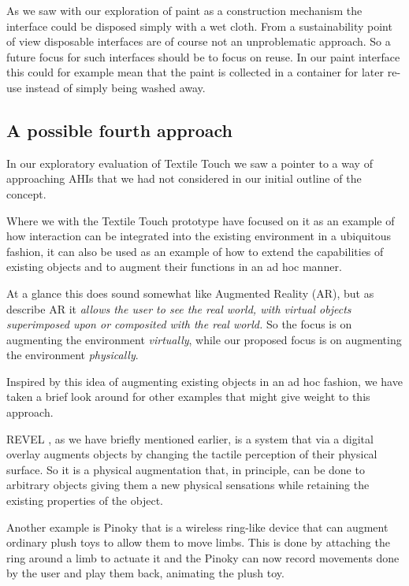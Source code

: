 As we saw with our exploration of paint as a construction mechanism the interface could be disposed simply with a wet cloth.
From a sustainability point of view disposable interfaces are of course not an unproblematic approach.
So a future focus for such interfaces should be to focus on reuse.
In our paint interface this could for example mean that the paint is collected in a container for later re-use instead of simply being washed away. 

\subsection{A possible fourth approach}
In our exploratory evaluation of Textile Touch we saw a pointer to a way of approaching AHIs that we had not considered in our initial outline of the concept.

Where we with the Textile Touch prototype have focused on it as an example of how interaction can be integrated into the existing environment in a ubiquitous fashion, it can also be used as an example of how to extend the capabilities of existing objects and to augment their functions in an ad hoc manner.

At a glance this does sound somewhat like Augmented Reality (AR), but as \citet{azuma1997survey} describe AR it \emph{allows the user to see the real world, with virtual objects superimposed upon or composited with the real world.}
So the focus is on augmenting the environment \emph{virtually}, while our proposed focus is on augmenting the environment \emph{physically}.

Inspired by this idea of augmenting existing objects in an ad hoc fashion, we have taken a brief look around for other examples that might give weight to this approach.

REVEL \citep{bau2013revel}, as we have briefly mentioned earlier, is a system that via a digital overlay augments objects by changing the tactile perception of their physical surface.
So it is a physical augmentation that, in principle, can be done to arbitrary objects giving them a new physical sensations while retaining the existing properties of the object.

Another example is Pinoky \citep{sugiura2012pinoky} that is a wireless ring-like device that can augment ordinary plush toys to allow them to move limbs.
This is done by attaching the ring around a limb to actuate it and the Pinoky can now record movements done by the user and play them back, animating the plush toy.

